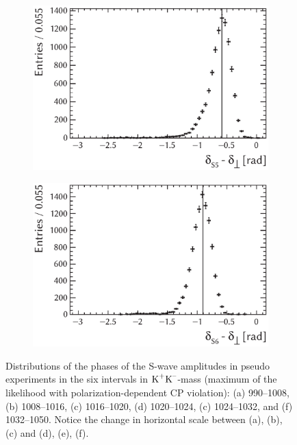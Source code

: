 \begin{figure}[tbp]
  \vspace*{0.02\textwidth}
  \begin{subfigure}{0.49\textwidth}
    \includegraphics[width=\textwidth]{graphics/results/parDist_polarDep_ASOddPhase_bin4}
    \caption{}
  \end{subfigure}
  \hfill%
  \begin{subfigure}{0.49\textwidth}
    \includegraphics[width=\textwidth]{graphics/results/parDist_polarDep_ASOddPhase_bin5}
    \caption{}
  \end{subfigure}

  \caption{Distributions of the phases of the S-wave amplitudes in pseudo experiments in the six intervals in $\text{K}^\text{+}\text{K}^\text{--}$-mass
           (maximum of the likelihood with polarization-dependent CP violation):
           (a) 990--1008\unitsp\MeV, (b) 1008--1016\unitsp\MeV, (c) 1016--1020\unitsp\MeV,
           (d) 1020--1024\unitsp\MeV, (c) 1024--1032\unitsp\MeV, and (f) 1032--1050\unitsp\MeV.
           Notice the change in horizontal scale between (a), (b), (c) and (d), (e), (f).}
  \label{fig:parDists_SWavePhases}
\end{figure}

